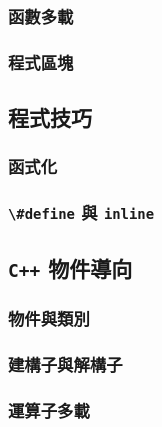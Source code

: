 \documentclass[12pt,a4paper,oneside]{article}
\begin{document}
\begin{CJK}{UTF8}{bkai}
\subsubsection{函數多載}
\subsubsection{程式區塊}

\subsection{程式技巧}
\subsubsection{函式化}
\subsubsection{\lstinline!\#define! 與 \lstinline!inline!}

\subsection{\texttt{C++} 物件導向}
\subsubsection{物件與類別}
\subsubsection{建構子與解構子}
\subsubsection{運算子多載}

\ifx \allfiles \undefined

\printindex

\clearpage
\end{CJK}
\end{document}
